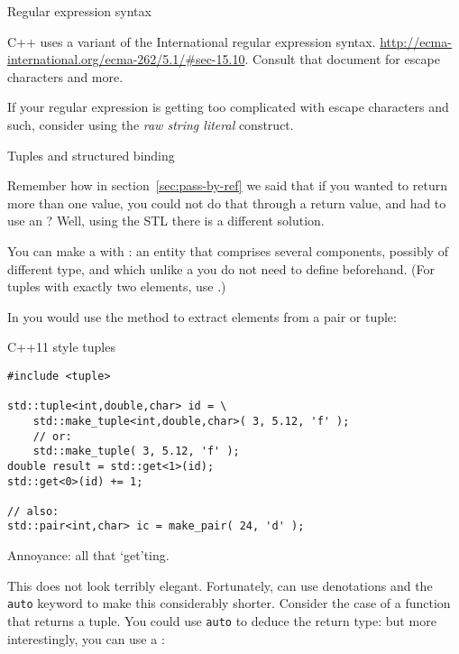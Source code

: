 
 {Regular expression syntax}

C++ uses a variant of the  International regular expression syntax.
\url{http://ecma-international.org/ecma-262/5.1/#sec-15.10}.
Consult that document for escape characters and more.

If your regular expression is getting too complicated with escape characters
and such, consider using the
\emph{raw string literal}
construct.

 {Tuples and structured binding}
\label{sec:tuple}

Remember how in section~\ref{sec:pass-by-ref} we said that if you
wanted to return more than one value, you could not do that through a
return value, and had to use an ?
Well, using the \ac{STL} there is a different solution.

You can make a  with :
an entity that comprises several
components, possibly of different type, and which unlike a
 you do not need to define beforehand.
(For tuples with exactly two elements, use .)

In  you would use the  method
to extract elements from a pair or tuple:

\lstset{style=reviewcode,language=C++}
\begin{block}{C++11 style tuples}
  \label{sl:tuple11}
\begin{lstlisting}
#include <tuple>

std::tuple<int,double,char> id = \
    std::make_tuple<int,double,char>( 3, 5.12, 'f' );
    // or:
    std::make_tuple( 3, 5.12, 'f' );
double result = std::get<1>(id);
std::get<0>(id) += 1;

// also:
std::pair<int,char> ic = make_pair( 24, 'd' );
\end{lstlisting}
Annoyance: all that `get'ting.
\end{block}

This does not look terribly elegant. Fortunately,
 can use denotations and the \lstinline{auto}
keyword to make this considerably shorter. Consider the case of a
function that returns a tuple. You could use \lstinline{auto} to deduce the
return type:
%
%
but more interestingly, you can use a
:
%

